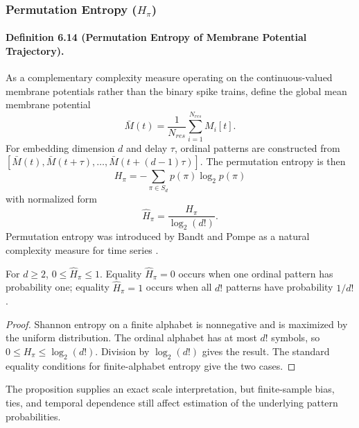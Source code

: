 \subsubsection{Permutation Entropy ($H_{\pi}$)}

\paragraph{Definition 6.14 (Permutation Entropy of Membrane Potential Trajectory).}
As a complementary complexity measure operating on the continuous-valued membrane potentials rather than the binary spike trains, define the global mean membrane potential
\begin{equation}
\bar{M}(t)=\frac{1}{N_{res}}\sum_{i=1}^{N_{res}} M_i[t].
\end{equation}
For embedding dimension $d$ and delay $\tau$, ordinal patterns are constructed from $[\bar{M}(t),\bar{M}(t+\tau),\ldots,\bar{M}(t+(d-1)\tau)]$. The permutation entropy is then
\begin{equation}
H_{\pi}=-\sum_{\pi\in S_d} p(\pi)\log_2 p(\pi)
\end{equation}
with normalized form
\begin{equation}
\hat{H}_{\pi}=\frac{H_{\pi}}{\log_2(d!)}.
\end{equation}
Permutation entropy was introduced by Bandt and Pompe as a natural complexity measure for time series \cite{bandt_permutation_2002}.

\begin{proposition}
\label{prop:permutation_entropy_bounds}
For $d\ge2$, $0\le\hat H_\pi\le1$. Equality $\hat H_\pi=0$ occurs when one
ordinal pattern has probability one; equality $\hat H_\pi=1$ occurs when all
$d!$ patterns have probability $1/d!$.
\end{proposition}

\begin{proof}
Shannon entropy on a finite alphabet is nonnegative and is maximized by the
uniform distribution. The ordinal alphabet has at most $d!$ symbols, so
$0\le H_\pi\le\log_2(d!)$. Division by $\log_2(d!)$ gives the result. The
standard equality conditions for finite-alphabet entropy give the two cases.
\end{proof}

The proposition supplies an exact scale interpretation, but finite-sample bias,
ties, and temporal dependence still affect estimation of the underlying pattern
probabilities.

